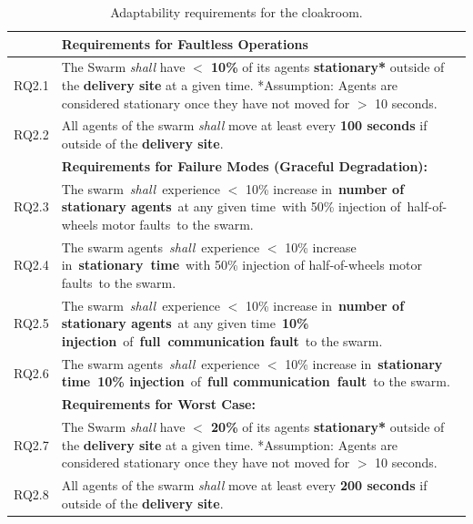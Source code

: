 \documentclass[lettersize,journal]{IEEEtran}
\begin{document}
\begin{table}[!t]
	\centering
	\begin{tabular}{|p{7mm}|p{72mm}|}
		\hline
		& \textbf{Requirements for Faultless Operations} \\
		\hline
		RQ2.1 & The Swarm \emph{shall} have \textbf{$<$ 10\%} of its agents \textbf{stationary*} outside of the \textbf{delivery site} at a given time.
		*Assumption: Agents are considered stationary once they have not moved for $>$ 10 seconds.
		\\ 
		\hline
		RQ2.2 & All agents of the swarm \emph{shall} move at least every \textbf{100 seconds} if outside of the \textbf{delivery site}. \\ 
		\hline
		& \textbf{Requirements for Failure Modes (Graceful Degradation): } \\
		\hline
		RQ2.3 & The swarm \emph{shall} experience $<$ 10\% increase in \textbf{number of stationary agents} at any given time with 50\% injection of half-of-wheels motor faults to the swarm. \\
		\hline
		RQ2.4 & The swarm agents \emph{shall} experience $<$ 10\% increase in \textbf{stationary time} with 50\% injection of half-of-wheels motor faults to the swarm.\\ 
		\hline
		RQ2.5 & The swarm \emph{shall} experience $<$ 10\% increase in \textbf{number of stationary agents} at any given time \textbf{10\% injection} of \textbf{full communication fault} to the swarm.\\
		\hline
		RQ2.6 & The swarm agents \emph{shall} experience $<$ 10\% increase in \textbf{stationary time 10\% injection} of \textbf{full communication fault} to the swarm. \\	
		\hline
		& \textbf{Requirements for Worst Case: } \\
		\hline
		RQ2.7 & The Swarm \emph{shall} have \textbf{$<$ 20\%} of its agents \textbf{stationary*} outside of the \textbf{delivery site} at a given time.
		*Assumption: Agents are considered stationary once they have not moved for $>$ 10 seconds. \\			\hline	
		RQ2.8 & All agents of the swarm \emph{shall} move at least every \textbf{200 seconds} if outside of the \textbf{delivery site}.\\		[1ex] 		
		\hline
	\end{tabular}
	\caption{\label{tab:adaptability}Adaptability requirements for the cloakroom.}
\end{table}   
\end{document}
